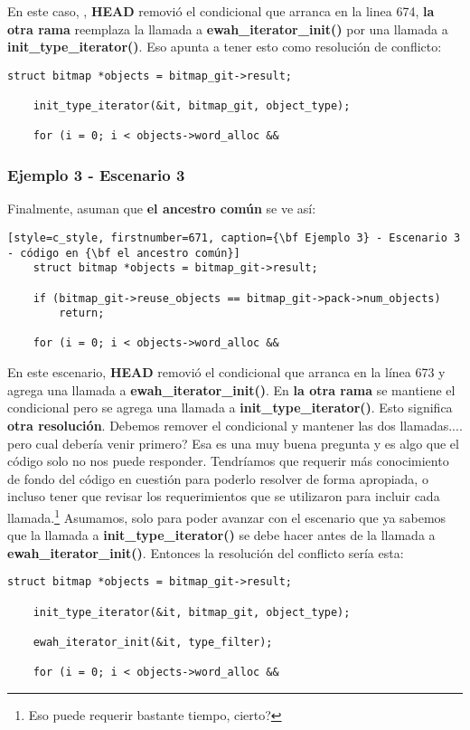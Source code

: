 En este caso, , {\bf HEAD} removió el condicional que arranca en la linea 674, {\bf la otra rama} reemplaza la llamada a
{\bf ewah\_iterator\_init()} por una llamada a {\bf init\_type\_iterator()}. Eso apunta a tener esto como resolución de
conflicto:

\begin{lstlisting}[style=c_style, firstnumber=671, caption={\bf Ejemplo 3} - Escenario 2 - Resolución del conflicto]
	struct bitmap *objects = bitmap_git->result;

	init_type_iterator(&it, bitmap_git, object_type);

	for (i = 0; i < objects->word_alloc &&
\end{lstlisting}

\subsubsection{Ejemplo 3 - Escenario 3}
Finalmente, asuman que {\bf el ancestro común} se ve así:

\begin{lstlisting}[style=c_style, firstnumber=671, caption={\bf Ejemplo 3} - Escenario 3 - código en {\bf el ancestro común}]
	struct bitmap *objects = bitmap_git->result;

	if (bitmap_git->reuse_objects == bitmap_git->pack->num_objects)
		return;

	for (i = 0; i < objects->word_alloc &&
\end{lstlisting}

En este escenario, {\bf HEAD} removió el condicional que arranca en la línea 673 y agrega una llamada a {\bf ewah\_iterator\_init()}.
En {\bf la otra rama} se mantiene el condicional pero se agrega una llamada a {\bf init\_type\_iterator()}. Esto significa
{\bf otra resolución}.  Debemos remover el condicional y mantener las dos llamadas.... pero cual debería venir primero? Esa es
una muy buena pregunta y es algo que el código solo no nos puede responder. Tendríamos que requerir más conocimiento de fondo del
código en cuestión para poderlo resolver de forma apropiada, o incluso tener que revisar los requerimientos que se utilizaron para
incluir cada llamada.\footnote{Eso puede requerir bastante tiempo, cierto?} Asumamos, solo para poder avanzar con el escenario que
ya sabemos que la llamada a {\bf init\_type\_iterator()} se debe hacer antes de la llamada a {\bf ewah\_iterator\_init()}. Entonces
la resolución del conflicto sería esta:

\begin{lstlisting}[style=c_style, firstnumber=671, caption={\bf Ejemplo 3} - Escenario 3 - Resolución del conflicto]
	struct bitmap *objects = bitmap_git->result;

	init_type_iterator(&it, bitmap_git, object_type);

	ewah_iterator_init(&it, type_filter);

	for (i = 0; i < objects->word_alloc &&
\end{lstlisting}

